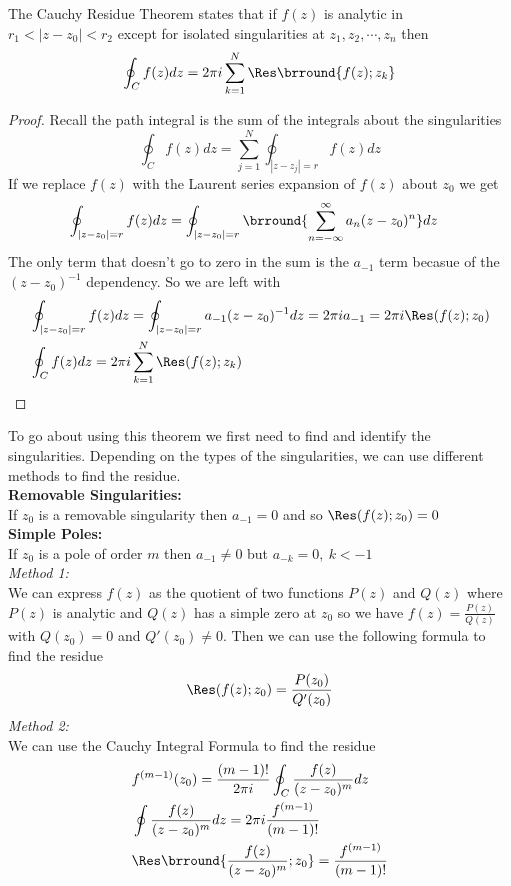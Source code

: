 The Cauchy Residue Theorem states that if $f(z)$ is analytic in $r_1<|z-z_0|<r_2$ except for isolated singularities at $z_1,z_2,\cdots,z_n$ then
\[\oint_Cf(z)dz=2\pi i\sum_{k=1}^N\Res\brround{f(z);z_k}\]
\begin{proof}
Recall the path integral is the sum of the integrals about the singularities
\[\oint_C f(z)dz=\sum_{j=1}^N\oint_{|z-z_j|=r}f(z)dz\]
If we replace $f(z)$ with the Laurent series expansion of $f(z)$ about $z_0$ we get
\begin{align*}
    &\oint_{|z-z_0|=r}f(z)dz=\oint_{|z-z_0|=r}\brround{\sum_{n=-\infty}^\infty a_n(z-z_0)^n}dz
\end{align*}
The only term that doesn't go to zero in the sum is the $a_{-1}$ term becasue of the $(z-z_0)^{-1}$ dependency. So we are left with
\begin{align*}
    &\oint_{|z-z_0|=r}f(z)dz=\oint_{|z-z_0|=r}a_{-1}(z-z_0)^{-1}dz=2\pi i a_{-1}=2\pi i\Res(f(z);z_0)\\
    &\oint_C f(z)dz=2\pi i\sum_{k=1}^N\Res(f(z);z_k)
\end{align*}
\end{proof}
To go about using this theorem we first need to find and identify the singularities. Depending on the types of the singularities, we can use different methods to find the residue.\\
\textbf{Removable Singularities:}\\
If $z_0$ is a removable singularity then $a_{-1}=0$ and so $\Res(f(z);z_0)=0$\\
\textbf{Simple Poles:}\\
If $z_0$ is a pole of order $m$ then $a_{-1}\neq0$ but $a_{-k}=0,\ k<-1$\\
\textit{Method 1:}\\
We can express $f(z)$ as the quotient of two functions $P(z)$ and $Q(z)$ where $P(z)$ is analytic and $Q(z)$ has a simple zero at $z_0$ so we have $f(z)=\frac{P(z)}{Q(z)}$ with $Q(z_0)=0$ and $Q'(z_0)\neq 0$. Then we can use the following formula to find the residue
\[\Res(f(z);z_0)=\frac{P(z_0)}{Q'(z_0)}\]
\textit{Method 2:}\\
We can use the Cauchy Integral Formula to find the residue
\begin{align*}
    &f^{(m-1)}(z_0)=\frac{(m-1)!}{2\pi i}\oint_C\frac{f(z)}{(z-z_0)^m}dz\\
    &\oint\frac{f(z)}{(z-z_0)^m}dz=2\pi i\frac{f^{(m-1)}}{(m-1)!}\\
    &\Res\brround{\frac{f(z)}{(z-z_0)^m};z_0}=\frac{f^{(m-1)}}{(m-1)!}
\end{align*}
